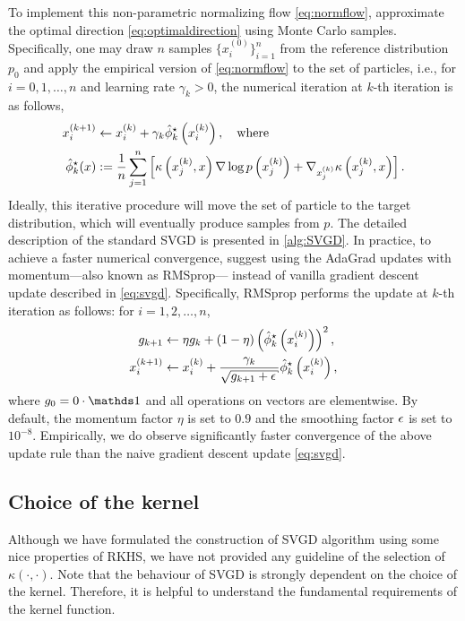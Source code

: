 To implement this non-parametric normalizing flow \cref{eq:normflow}, \citet{liu2016stein} approximate the optimal direction \cref{eq:optimaldirection} using Monte Carlo samples.
Specifically, one may draw $n$ samples $\{x_i^{(0)}  \}_{i = 1}^n$  from the reference distribution $p_0$ and apply the empirical version of \cref{eq:normflow} to the set of particles, i.e., for $i = 0, 1,\dots, n$ and learning rate $\gamma_k >0$,  the numerical iteration at $k$-th iteration is as follows,
\[
   \begin{aligned}
    x_{i}^{(k+1)} & \leftarrow x_{i}^{(k)}+ \gamma_k \hat{\phi}_k^{\star}\left(x_{i}^{(k)}\right),\quad \text {where } \\
    \hat{\phi}_k^{\star}(x) & := \frac{1}{n} \sum_{j=1}^{n}\left[\kappa\left(x_{j}^{(k)}, x\right) \nabla \log p\left(x_{j}^{(k)}\right)+\nabla_{x_{j}^{(k)}} \kappa\left(x_{j}^{(k)}, x\right)\right].
   \end{aligned}
   \label{eq:svgd}
\]
Ideally, this iterative procedure will move the set of particle to the target distribution, which will eventually produce samples from $p$.  The detailed description of the standard SVGD is presented in \cref{alg:SVGD}.
In practice, to achieve a faster numerical convergence, \citet{liu2016stein} suggest using the AdaGrad updates with momentum---also known as RMSprop--- instead of vanilla gradient descent update described in \cref{eq:svgd}.  
Specifically, RMSprop performs the update at $k$-th iteration as follows: for $i = 1, 2, \dots, n$,
\[\label{eq:rms}
    \begin{aligned}
        g_{k+1} &\gets \eta g_k + (1 - \eta) \left(\hat{\phi}_k^{\star}\left(x_{i}^{(k)}\right)\right)^2,\\
        x_{i}^{(k+1)} &\gets x_i^{(k)} + \frac{\gamma_k}{\sqrt{g_{k+1}+\eps} } \hat{\phi}_k^{\star}\left(x_{i}^{(k)}\right),  
    \end{aligned}  
\]
where $g_0 = 0\cdot\ind$ and all operations on vectors are elementwise. By default, the momentum factor $\eta$ is set to $0.9$ and the smoothing factor $\epsilon$ is set to $10^{-8}$. Empirically, we do observe significantly faster convergence of the above update rule than the naive gradient descent update \cref{eq:svgd}. 


\subsection{Choice of the kernel} \label{sec:kernelchoice}

Although we have formulated the construction of SVGD algorithm using some nice properties of RKHS, we have not provided any guideline of the selection of $\kappa(\cdot, \cdot)$. Note that the behaviour of SVGD is strongly dependent on the choice of the kernel.  Therefore, it is helpful to understand the fundamental requirements of the kernel function.

